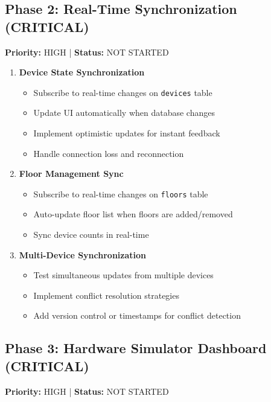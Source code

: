 \documentclass[12pt,a4paper]{article}
\begin{document}
\subsection{Phase 2: Real-Time Synchronization (CRITICAL)}
\textbf{Priority:} HIGH | \textbf{Status:} \textcolor{required}{NOT STARTED}

\begin{enumerate}[leftmargin=*]
    \item \textbf{Device State Synchronization}
    \begin{itemize}
        \item Subscribe to real-time changes on \texttt{devices} table
        \item Update UI automatically when database changes
        \item Implement optimistic updates for instant feedback
        \item Handle connection loss and reconnection
    \end{itemize}
    
    \item \textbf{Floor Management Sync}
    \begin{itemize}
        \item Subscribe to real-time changes on \texttt{floors} table
        \item Auto-update floor list when floors are added/removed
        \item Sync device counts in real-time
    \end{itemize}
    
    \item \textbf{Multi-Device Synchronization}
    \begin{itemize}
        \item Test simultaneous updates from multiple devices
        \item Implement conflict resolution strategies
        \item Add version control or timestamps for conflict detection
    \end{itemize}
\end{enumerate}

\subsection{Phase 3: Hardware Simulator Dashboard (CRITICAL)}
\textbf{Priority:} HIGH | \textbf{Status:} \textcolor{required}{NOT STARTED}
\end{document}
